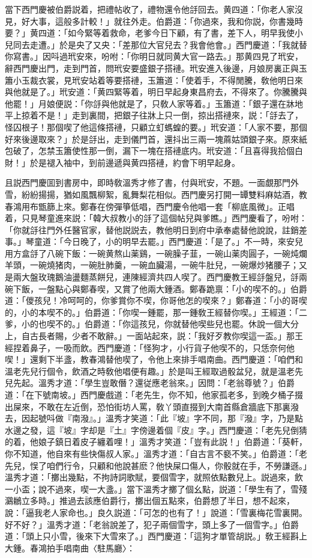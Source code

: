 當下西門慶被伯爵説着，把禮帖收了，禮物還令他㧱回去。黄四道：「你老人家沒見，好大事，這般多計較！」就往外走。伯爵道：「你過來，我和你説，你書幾時要？」黄四道：「如今緊等着救命，老爹今日下顧，有了書，差下人，明早我使小兒同去走遭。」於是央了又央：「差那位大官兒去？我會他會。」西門慶道：「我就替你寫書。」因呌過玳安來，吩咐：「你明日就同黄大官一路去。」那黄四見了玳安，辭西門慶出門，走到門首，問玳安要盛銀子搭褳。玳安進入後邊，月娘房裏正與玉簫小玉裁衣裳，見玳安站着等要搭褳，玉簫道：「使着手，不得閒騰，敎他明日來與他就是了。」玳安道：「黄四緊等着，明日早起身東昌府去，不得來了。你騰騰與他罷！」月娘便説：「你㧱與他就是了，只敎人家等着。」玉簫道：「銀子還在牀地平上掠着不是！」走到裏間，把銀子往牀上只一倒，掠出搭褳來，説：「㧱去了，怪囚根子！那個喫了他這條搭褳，只顧立虰螞蝗的要。」玳安道：「人家不要，那個好來後邊取來？」於是㧱出，走到儀門首，還抖出三兩一塊蔴姑頭銀子來。原來紙包破了，怎禁玉簫使性那一倒，漏下一塊在搭褳底内。玳安道：「且喜得我拾個白財！」於是褪入袖中，到前邊遞與黄四搭褳，約會下明早起身。

且説西門慶囬到書房中，即時敎溫秀才修了書，付與玳安，不題。一面覷那門外雪，紛紛揚揚，猶如風飄柳絮，亂舞梨花相似。西門慶另打開一罈雙料麻姑酒，教春鴻用布甑篩上來。鄭春在傍彈箏低唱，西門慶令他唱一套「柳底風微」。正唱着，只見琴童進來説：「韓大叔教小的㧱了這個帖兒與爹瞧。」西門慶看了，吩咐：「你就㧱往門外任醫官家，替他説説去，教他明日到府中承奉處替他說說，註銷差事。」琴童道：「今日晚了，小的明早去罷。」西門慶道：「是了。」不一時，來安兒用方盒㧱了八碗下飯：一碗黄熬山薬鷄，一碗臊子韮，一碗山薬肉圓子，一碗炖爛羊頭，一碗燒猪肉，一碗肚肺羹，一碗血臟湯，一碗牛肚兒，一碗爆炒猪腰子；又是兩大盤玫瑰鵝油盪麵蒸餅兒，連陳經濟共四人喫了。西門慶教王經㧱盤兒，㧱兩碗下飯，一盤點心與鄭春喫，又賞了他兩大鍾酒。鄭春跪禀：「小的喫不的。」伯爵道：「儍孩兒！冷呵呵的，你爹賞你不喫，你哥他怎的喫來？」鄭春道：「小的哥喫的，小的本喫不的。」伯爵道：「你喫一鍾罷，那一鍾敎王經替你喫。」王經道：「二爹，小的也喫不的。」伯爵道：「你這孩兒，你就替他喫些兒也罷。休說一個大分上，自古長者賜，少者不敢辭。」一面站起來，説：「我好歹教你喫這一盃。」那王經捏着鼻子，一吸而飲。西門慶道：「怪狗才，小行貨子他喫不的，只恁奈何他喫！」還剩下半盞，教春鴻替他喫了，令他上來排手唱南曲。西門慶道：「咱們和溫老先兒行個令，飲酒之時敎他唱便有趣。」於是叫王經取過骰盆兒，就是溫老先兒先起。溫秀才道：「學生豈敢僭？還従應老翁來。」因問：「老翁尊號？」伯爵道：「在下號南坡。」西門慶戲道：「老先生，你不知，他家孤老多，到晚夕桶子掇出屎來，不敢在左近倒，恐怕街坊人罵，敎丫頭直掇到大南首縣倉牆底下那裏潑去，因起號呌做『南潑』。」溫秀才笑道：「此『坡』字不同，那『潑』字，乃是點水邊之發，這『坡』字却是『土』字傍邊着個『皮』字。」西門慶道：「老先兒倒猜的着，他娘子鎮日着皮子纏着哩！」溫秀才笑道：「豈有此説！」伯爵道：「葵軒，你不知道，他自來有些快傷叔人家。」溫秀才道：「自古言不褻不笑。」伯爵道：「老先兒，悮了咱們行令，只顧和他說甚麽？他快屎口傷人，你骰就在手，不勞謙遜。」溫秀才道：「擲出幾點，不拘詩詞歌賦，要個雪字，就照依點數兒上。説過來，飲一小盃；說不過來，喫一大盞。」當下溫秀才擲了個幺點，説道：「學生有了，雪殘鸂鶒立多時。」推過去該應伯爵行，擲出個五點來，伯爵想了半日，想不起來，說：「逼我老人家命也。」良久説道：「可怎的也有了！」說道：「雪裏梅花雪裏開。好不好？」溫秀才道：「老翁說差了，犯子兩個雪字，頭上多了一個雪字。」伯爵道：「頭上只小雪，後來下大雪來了。」西門慶道：「這狗才單管胡説。」敎王經斟上大鍾。春鴻拍手唱南曲〈駐馬廳〉：

